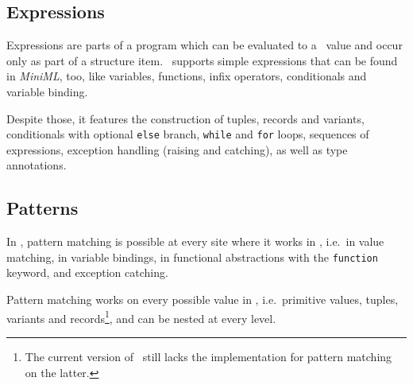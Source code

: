 \subsection*{Expressions}

Expressions are parts of a program which can be evaluated to a \ocaml\ value
and occur only as part of a structure item.
\easyocaml\ supports simple expressions that can be found in \textsl{MiniML},
too, like variables, functions, infix operators, conditionals and variable
binding.

Despite those, it features the construction of tuples, records and variants,
conditionals with optional \texttt{else} branch, \texttt{while} and
\texttt{for} loops, sequences of expressions, exception handling (raising and
catching), as well as type annotations.

\subsection*{Patterns}

In \easyocaml, pattern matching is possible at every site where it works in
\ocaml, i.e.\ in value matching, in variable bindings, in
functional abstractions with the \texttt{function} keyword, and exception
catching.

Pattern matching works on every possible value in \easyocaml, i.e.\ primitive
values, tuples, variants and records\footnote{The current version of \easyocaml\
still lacks the implementation for pattern matching on the latter.}, and can be
nested at every
level.

